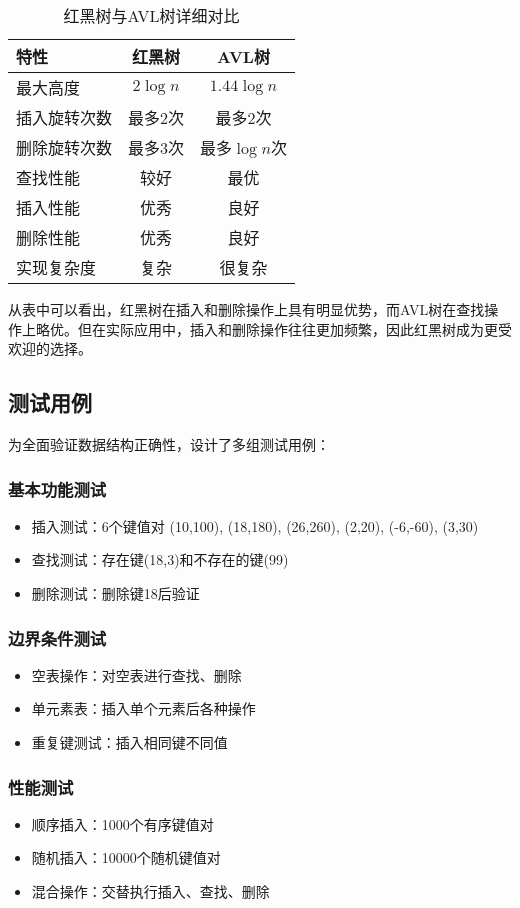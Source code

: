 \documentclass[12pt,a4paper]{article}
\begin{document}
\begin{table}[h]
\centering
\caption{红黑树与AVL树详细对比}
\begin{tabular}{|l|c|c|}
\hline
特性 & 红黑树 & AVL树 \\
\hline
最大高度 & $2\log n$ & $1.44 \log n$ \\
插入旋转次数 & 最多2次 & 最多2次 \\
删除旋转次数 & 最多3次 & 最多$\log n$次 \\
查找性能 & 较好 & 最优 \\
插入性能 & 优秀 & 良好 \\
删除性能 & 优秀 & 良好 \\
实现复杂度 & 复杂 & 很复杂 \\
\hline
\end{tabular}
\end{table}

从表中可以看出，红黑树在插入和删除操作上具有明显优势，而AVL树在查找操作上略优。但在实际应用中，插入和删除操作往往更加频繁，因此红黑树成为更受欢迎的选择。
\subsection{测试用例}
为全面验证数据结构正确性，设计了多组测试用例：

\subsubsection{基本功能测试}
\begin{itemize}
\item 插入测试：6个键值对 (10,100), (18,180), (26,260), (2,20), (-6,-60), (3,30)
\item 查找测试：存在键(18,3)和不存在的键(99)
\item 删除测试：删除键18后验证
\end{itemize}

\subsubsection{边界条件测试}
\begin{itemize}
\item 空表操作：对空表进行查找、删除
\item 单元素表：插入单个元素后各种操作
\item 重复键测试：插入相同键不同值
\end{itemize}

\subsubsection{性能测试}
\begin{itemize}
\item 顺序插入：1000个有序键值对
\item 随机插入：10000个随机键值对
\item 混合操作：交替执行插入、查找、删除
\end{itemize}
\end{document}
